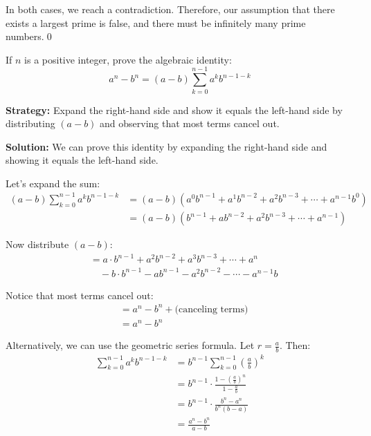 In both cases, we reach a contradiction. Therefore, our assumption that there exists a largest prime is false, and there must be infinitely many prime numbers.\qed



\begin{problembox}
\begin{problemstatement}
If $n$ is a positive integer, prove the algebraic identity:
\[
a^n - b^n = (a - b)\sum_{k=0}^{n-1} a^k b^{n-1-k}
\]
\end{problemstatement}
\end{problembox}

\noindent\textbf{Strategy:} Expand the right-hand side and show it equals the left-hand side by distributing $(a-b)$ and observing that most terms cancel out.

\bigskip\noindent\textbf{Solution:}
We can prove this identity by expanding the right-hand side and showing it equals the left-hand side.

Let's expand the sum:
\begin{align*}
(a - b)\sum_{k=0}^{n-1} a^k b^{n-1-k} &= (a - b)(a^0 b^{n-1} + a^1 b^{n-2} + a^2 b^{n-3} + \cdots + a^{n-1} b^0) \\
&= (a - b)(b^{n-1} + a b^{n-2} + a^2 b^{n-3} + \cdots + a^{n-1})
\end{align*}

Now distribute $(a - b)$:
\begin{align*}
&= a \cdot b^{n-1} + a^2 b^{n-2} + a^3 b^{n-3} + \cdots + a^n \\
&\quad - b \cdot b^{n-1} - a b^{n-1} - a^2 b^{n-2} - \cdots - a^{n-1} b
\end{align*}

Notice that most terms cancel out:
\begin{align*}
&= a^n - b^n + \text{(canceling terms)} \\
&= a^n - b^n
\end{align*}

Alternatively, we can use the geometric series formula. Let $r = \frac{a}{b}$. Then:
\begin{align*}
\sum_{k=0}^{n-1} a^k b^{n-1-k} &= b^{n-1} \sum_{k=0}^{n-1} \left(\frac{a}{b}\right)^k \\
&= b^{n-1} \cdot \frac{1 - \left(\frac{a}{b}\right)^n}{1 - \frac{a}{b}} \\
&= b^{n-1} \cdot \frac{b^n - a^n}{b^n(b - a)} \\
&= \frac{a^n - b^n}{a - b}
\end{align*}

